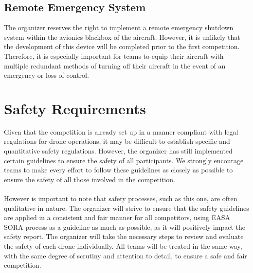 \documentclass{article}
\begin{document}
\subsection{Remote Emergency System}
The organizer reserves the right to implement a remote emergency shutdown system within the avionics blackbox of the aircraft. However, it is unlikely that the development of this device will be completed prior to the first competition. Therefore, it is especially important for teams to equip their aircraft with multiple redundant methods of turning off their aircraft in the event of an emergency or loss of control.

\section{Safety Requirements}
Given that the competition is already set up in a manner compliant with legal regulations for drone operations, it may be difficult to establish specific and quantitative safety regulations. However, the organizer has still implemented certain guidelines to ensure the safety of all participants. We strongly encourage teams to make every effort to follow these guidelines as closely as possible to ensure the safety of all those involved in the competition. 
\\ \\ 
However is important to note that safety processes, such as this one, are often qualitative in nature. The organizer will strive to ensure that the safety guidelines are applied in a consistent and fair manner for all competitors, using EASA SORA process as a guideline as much as possible, as it will positively impact the safety report. The organizer will take the necessary steps to review and evaluate the safety of each drone individually. All teams will be treated in the same way, with the same degree of scrutiny and attention to detail, to ensure a safe and fair competition.
\end{document}
